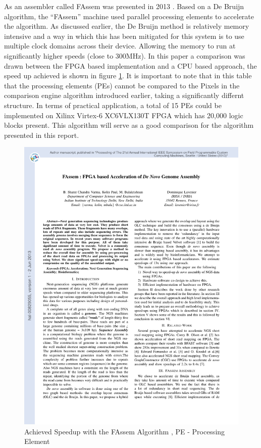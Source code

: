 As an assembler called FAssem was presented in 2013 \cite{varma2013fassem}. Based on a De Bruijn algorithm, the ``FAssem'' machine used parallel processing elements to accelerate the algorithm. As discussed earlier, the De Bruijn method is relatively memory intensive and a way in which this has been mitigated for this system is to use multiple clock domains across their device. Allowing the memory to run at significantly higher speeds (close to 300MHz). In this paper a comparison was drawn between the FPGA based implementation and a CPU based approach, the speed up achieved is shown in figure \ref{fig:fassem}. It is important to note that in this table that the processing elements (PEs) cannot be compared to the Pixels in the comparison engine algorithm introduced earlier, taking a significantly differnt structure. In terms of practical application, a total of 15 PEs could be implemented on Xilinx Virtex-6 XC6VLX130T FPGA which has 20,000 logic blocks present. This algorithm will serve as a good comparison for the algorithm presented in this report. 

\begin{figure}[h]
  \centering
  \includegraphics[width=\textwidth, page=3]{./figs/FAssem.pdf}
  \caption{Achieved Speedup with the FAssem Algorithm \cite{varma2013fassem}, PE - Processing Element}
  \label{fig:fassem}
\end{figure}




